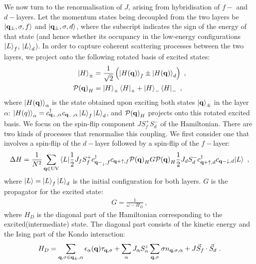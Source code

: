 \documentclass[%
reprint,
superscriptaddress,
groupedaddress,
superscriptaddress,
onecolumn,
10pt
]{revtex4-2}
\begin{document}
We now turn to the renormalisation of \(J\), arising from hybridisation of \(f-\) and \(d-\)layers. Let the momentum states being decoupled from the two layers be \(\ket{{\bf q}_\pm,\sigma,f}\) and \(\ket{{\bf q}_\pm,\sigma,d}\), where the subscript indicates the sign of the energy of that state (and hence whether its occupancy in the low-energy configurations \(\ket{L}_f\), \(\ket{L}_d\)). In order to capture coherent scattering processes between the two layers, we project onto the following rotated basis of excited states:
\begin{equation}\begin{aligned}
	\ket{H}_\pm &= \frac{1}{\sqrt{2}}\left(\ket{H({\bf q})}_f \pm \ket{H({\bf q})}_d\right)~,\\
	\mathcal{P({\bf q})}_H &= \ket{H}_+\bra{H}_+ + \ket{H}_-\bra{H}_-~,
\end{aligned}\end{equation}
where \(\ket{H({\bf q})}_\alpha\) is the state obtained upon exciting both states \(\ket{\bf q}_\pm\) in the layer \(\alpha\): \(\ket{H(q)}_\alpha = c^\dagger_{\bf q_+,\alpha}c_{\bf q_-,\alpha}\ket{L}_f\ket{L}_d\), and \(\mathcal{P({\bf q})}_H\) projects onto this rotated excited basis. We focus on the spin-flip component \(J S_f^+ S_d^-\) of the Hamiltonian. There are two kinds of processes that renormalise this coupling. We first consider one that involves a spin-flip of the \(d-\)layer followed by a spin-flip of the \(f-\)layer:
\begin{equation}\begin{aligned}\label{rgEqtn1}
	\Delta H = \frac{1}{N^2}\sum_{{\bf q} \in \text{UV}}\braket{L | \frac{1}{2}J_f S_f^+ c^\dagger_{{\bf q-}_\downarrow,f}c_{{\bf q+}\uparrow,f} \mathcal{P({\bf q})}_H G \mathcal{P({\bf q})}_H\frac{1}{2}J_dS_d^- c^\dagger_{{\bf q+}\uparrow,d}c_{{\bf q-}\downarrow,d} | L }~,
\end{aligned}\end{equation}
where \(\ket{L} = \ket{L}_f \ket{L}_d\) is the initial configuration for both layers. \(G\) is the propagator for the excited state:
\begin{equation}\begin{aligned}
	G = \frac{1}{\omega - H_D}~,
\end{aligned}\end{equation}
where \(H_D\) is the diagonal part of the Hamiltonian corresponding to the excited(intermediate) state. The diagonal part consists of the kinetic energy and the Ising part of the Kondo interaction:
\begin{equation}\begin{aligned}
	H_D = \sum_{{\bf q,\sigma}\in{\bf q}_\pm, \alpha}\epsilon_\alpha({\bf q})\tau_{{\bf q},\sigma} + \sum_\alpha J_\alpha S_\alpha^z \sum_{{\bf q},\sigma}\sigma n_{{\bf q},\sigma,\alpha} + J \vec{S}_f \cdot \vec{S}_d~.
\end{aligned}\end{equation}
\end{document}

